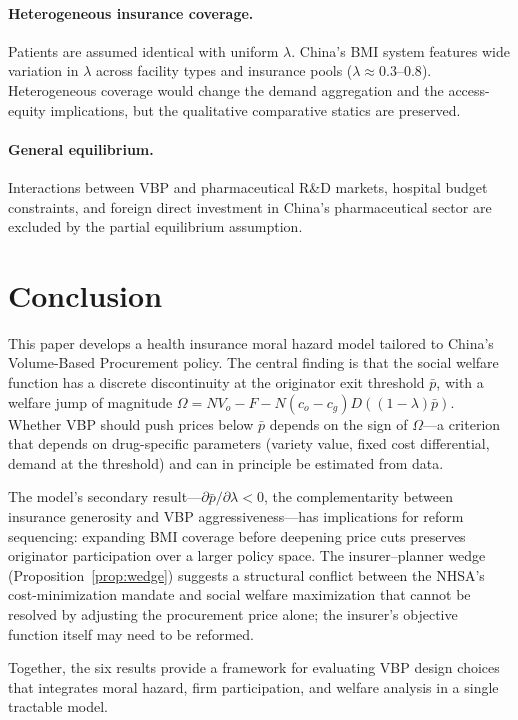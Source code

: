 \documentclass[12pt]{article}
\theoremstyle{plain}
\theoremstyle{definition}
\theoremstyle{remark}
\newcommand{\pbar}{\bar{p}}
\newcommand{\1}{\mathbf{1}}
\begin{document}
\paragraph{Heterogeneous insurance coverage.} Patients are assumed identical with uniform $\lambda$. China's BMI system features wide variation in $\lambda$ across facility types and insurance pools ($\lambda \approx 0.3$--$0.8$). Heterogeneous coverage would change the demand aggregation and the access-equity implications, but the qualitative comparative statics are preserved.

\paragraph{General equilibrium.} Interactions between VBP and pharmaceutical R\&D markets, hospital budget constraints, and foreign direct investment in China's pharmaceutical sector are excluded by the partial equilibrium assumption.

\section{Conclusion}
\label{sec:conclusion}

This paper develops a health insurance moral hazard model tailored to China's Volume-Based Procurement policy. The central finding is that the social welfare function has a discrete discontinuity at the originator exit threshold $\pbar$, with a welfare jump of magnitude $\Omega = NV_o - F - N(c_o-c_g)D((1-\lambda)\pbar)$. Whether VBP should push prices below $\pbar$ depends on the sign of $\Omega$---a criterion that depends on drug-specific parameters (variety value, fixed cost differential, demand at the threshold) and can in principle be estimated from data.

The model's secondary result---$\partial\pbar/\partial\lambda < 0$, the complementarity between insurance generosity and VBP aggressiveness---has implications for reform sequencing: expanding BMI coverage before deepening price cuts preserves originator participation over a larger policy space. The insurer--planner wedge (Proposition~\ref{prop:wedge}) suggests a structural conflict between the NHSA's cost-minimization mandate and social welfare maximization that cannot be resolved by adjusting the procurement price alone; the insurer's objective function itself may need to be reformed.

Together, the six results provide a framework for evaluating VBP design choices that integrates moral hazard, firm participation, and welfare analysis in a single tractable model.
\end{document}
